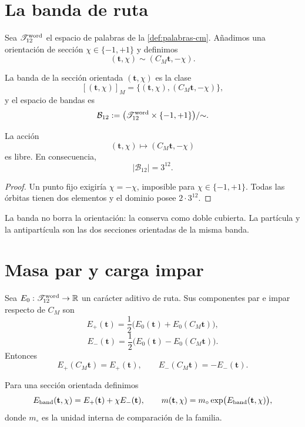 \section{La banda de ruta}

Sea \(\mathscr T_{12}^{\rm word}\) el espacio de palabras de la
\cref{def:palabras-cm}. Añadimos una orientación de sección
\(\chi\in\{-1,+1\}\) y definimos
\[
(\mathbf t,\chi)\sim(C_M\mathbf t,-\chi).
\]

\begin{definition}
\label{def:banda-dodecafasica-ruta}
La banda de la sección orientada \((\mathbf t,\chi)\) es la clase
\[
[(\mathbf t,\chi)]_M
=\{(\mathbf t,\chi),(C_M\mathbf t,-\chi)\},
\]
y el espacio de bandas es
\[
\mathcal B_{12}
:=
\bigl(\mathscr T_{12}^{\rm word}\times\{-1,+1\}\bigr)/{\sim}.
\]
\end{definition}

\begin{proposition}
\label{prop:accion-cm-orientada-libre}
La acción
\[
(\mathbf t,\chi)\longmapsto(C_M\mathbf t,-\chi)
\]
es libre. En consecuencia,
\[
|\mathcal B_{12}|=3^{12}.
\]
\end{proposition}

\begin{proof}
Un punto fijo exigiría \(\chi=-\chi\), imposible para
\(\chi\in\{-1,+1\}\). Todas las órbitas tienen dos elementos y el dominio
posee \(2\cdot3^{12}\).
\end{proof}

La banda no borra la orientación: la conserva como doble cubierta. La
partícula y la antipartícula son las dos secciones orientadas de la misma
banda.

\section{Masa par y carga impar}

Sea \(E_0:\mathscr T_{12}^{\rm word}\to\mathbb R\) un carácter aditivo de
ruta. Sus componentes par e impar respecto de \(C_M\) son
\[
E_+(\mathbf t)
=\frac12\bigl(E_0(\mathbf t)+E_0(C_M\mathbf t)\bigr),
\]
\[
E_-(\mathbf t)
=\frac12\bigl(E_0(\mathbf t)-E_0(C_M\mathbf t)\bigr).
\]
Entonces
\[
E_+(C_M\mathbf t)=E_+(\mathbf t),
\qquad
E_-(C_M\mathbf t)=-E_-(\mathbf t).
\]

\begin{definition}
\label{def:caracter-banda}
Para una sección orientada definimos
\[
E_{\rm band}(\mathbf t,\chi)
=E_+(\mathbf t)+\chi E_-(\mathbf t),
\qquad
m(\mathbf t,\chi)
=m_\circ\exp\bigl(E_{\rm band}(\mathbf t,\chi)\bigr),
\]
donde \(m_\circ\) es la unidad interna de comparación de la familia.
\end{definition}

